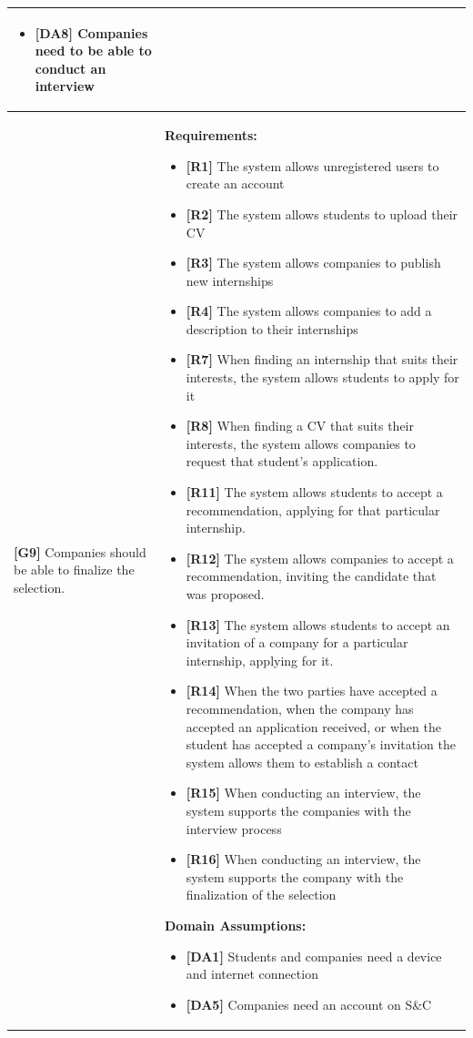 \begin{longtable}{|p{}|p{}|}
\begin{itemize}
    \item \textbf{[DA8]} Companies need to be able to conduct an interview
\end{itemize} \\
\hline
\textbf{[G9]} Companies should be able to finalize the selection. 
& 
\textbf{Requirements:}
\begin{itemize}
    \item \textbf{[R1]} The system allows unregistered users to create an account
    \item \textbf{[R2]} The system allows students to upload their CV
    \item \textbf{[R3]} The system allows companies to publish new internships
    \item \textbf{[R4]} The system allows companies to add a description to their internships
    \item \textbf{[R7]} When finding an internship that suits their interests, the system allows students to apply for it
    \item \textbf{[R8]} When finding a CV that suits their interests, the system allows companies to request that student's application.
    \item  \textbf{[R11]} The system allows students to accept a recommendation, applying for that particular internship.
    \item  \textbf{[R12]} The system allows companies to accept a recommendation, inviting the candidate that was proposed.
    \item \textbf{[R13]} The system allows students to accept an invitation of a company for a particular internship, applying for it.
    \item \textbf{[R14]} When the two parties have accepted a recommendation, when the company has accepted an application received, or when the student has accepted a company's invitation the system allows them to establish a contact
    \item \textbf{[R15]} When conducting an interview, the system supports the companies with the interview process
    \item \textbf{[R16]} When conducting an interview, the system supports the company with the finalization of the selection
\end{itemize}
\textbf{Domain Assumptions:}
\begin{itemize}
    \item \textbf{[DA1]} Students and companies need a device and internet connection
    \item \textbf{[DA5]} Companies need an account on S\&C

\end{itemize}
\end{longtable}
